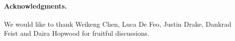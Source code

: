 \documentclass{article}
\theoremstyle{definition}
\begin{document}



  




\bigskip
\paragraph*{\textbf{Acknowledgments.}} We would like to thank Weikeng Chen, Luca De
Feo, Justin Drake, Dankrad Feist and Daira Hopwood for
fruitful discussions.



\end{document}
